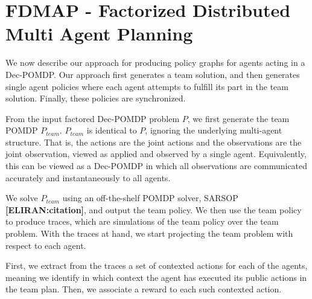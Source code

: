 \documentclass[letterpaper]{article} %
\newcommand{\eliran}[1]{\textbf{[\color{red}ELIRAN:#1]}}
\begin{document}
\section{FDMAP - Factorized Distributed Multi Agent Planning}

We now describe our approach for producing policy graphs for agents acting in a Dec-POMDP. Our approach first generates a team solution, and then generates single agent policies where each agent attempts to fulfill its part in the team solution. Finally, these policies are synchronized. 

From the input factored Dec-POMDP problem $P$, we first generate the team POMDP $P_{team}$. $P_{team}$ is identical to $P$, ignoring the underlying multi-agent structure. That is, the actions are the joint actions and the observations are the joint observation, viewed as applied 
and observed by a single agent. Equivalently, this can be viewed as a Dec-POMDP in which all observations are communicated accurately and instantaneously 
to all agents.

We solve $P_{team}$ using an off-the-shelf POMDP solver, SARSOP \cite{} \eliran{citation}, and output the team policy. We then use the team policy to produce traces, which are simulations of the team policy over the team problem. With the traces at hand, we start projecting the team problem with respect to each agent.

First, we extract from the traces a set of contexted actions for each of the agents, meaning we identify in which context the agent has executed its public actions in the team plan. Then, we associate a reward to each such contexted action.
\end{document}
